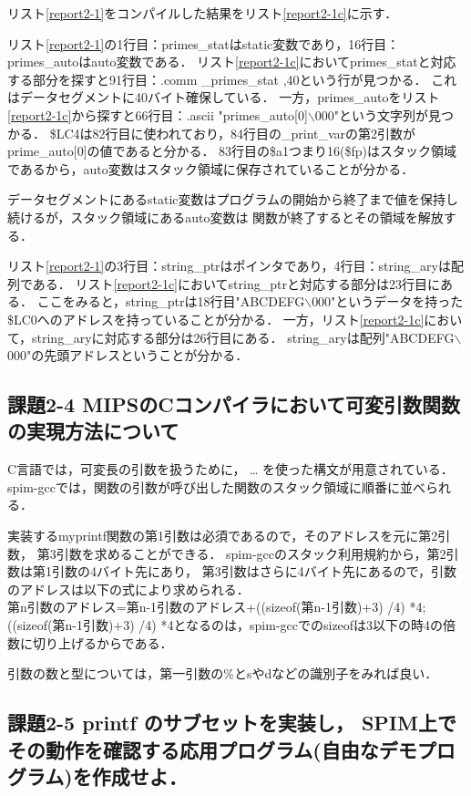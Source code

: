 \documentclass[11pt]{jarticle}
\begin{document}
リスト\ref{report2-1}をコンパイルした結果をリスト\ref{report2-1c}に示す．

リスト\ref{report2-1}の1行目：primes\_statはstatic変数であり，16行目：primes\_autoはauto変数である．
リスト\ref{report2-1c}においてprimes\_statと対応する部分を探すと91行目：.comm \_primes\_stat ,40という行が見つかる．
これはデータセグメントに40バイト確保している．
一方，primes\_autoをリスト\ref{report2-1c}から探すと66行目：.ascii "primes\_auto[0]$\backslash$000"という文字列が見つかる．
\$LC4は82行目に使われており，84行目の\_print\_varの第2引数がprime\_auto[0]の値であると分かる．
83行目の\$a1つまり16(\$fp)はスタック領域であるから，auto変数はスタック領域に保存されていることが分かる．

データセグメントにあるstatic変数はプログラムの開始から終了まで値を保持し続けるが，スタック領域にあるauto変数は
関数が終了するとその領域を解放する．

リスト\ref{report2-1}の3行目：string\_ptrはポインタであり，4行目：string\_aryは配列である．
リスト\ref{report2-1c}においてstring\_ptrと対応する部分は23行目にある．
ここをみると，string\_ptrは18行目"ABCDEFG$\backslash$000"というデータを持った\$LC0へのアドレスを持っていることが分かる．
一方，リスト\ref{report2-1c}において，string\_aryに対応する部分は26行目にある．
string\_aryは配列"ABCDEFG$\backslash$000"の先頭アドレスということが分かる．

\subsection{課題2-4 MIPSのCコンパイラにおいて可変引数関数の実現方法について}

C言語では，可変長の引数を扱うために， … を使った構文が用意されている．
spim-gccでは，関数の引数が呼び出した関数のスタック領域に順番に並べられる．

実装するmyprintf関数の第1引数は必須であるので，そのアドレスを元に第2引数，
第3引数を求めることができる．
spim-gccのスタック利用規約から，第2引数は第1引数の4バイト先にあり，
第3引数はさらに4バイト先にあるので，引数のアドレスは以下の式により求められる．
\\
第n引数のアドレス=第n-1引数のアドレス+((sizeof(第n-1引数)+3) /4) *4;
\\
((sizeof(第n-1引数)+3) /4) *4となるのは，spim-gccでのsizeofは3以下の時4の倍数に切り上げるからである．

引数の数と型については，第一引数の\%とsやdなどの識別子をみれば良い．

\subsection{課題2-5 printf のサブセットを実装し， SPIM上でその動作を確認する応用プログラム(自由なデモプログラム)を作成せよ．} \label{sec:2-5}
\end{document}
